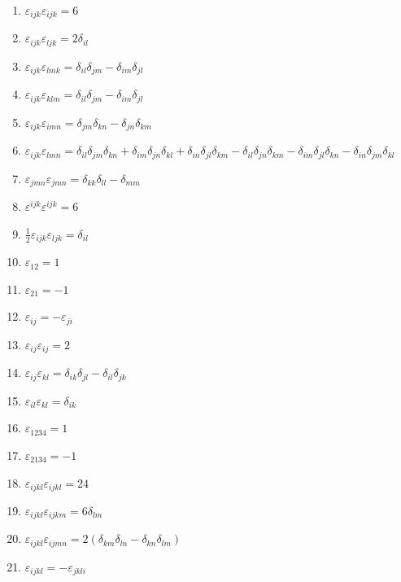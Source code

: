 \documentclass[11pt,a4paper]{article}
\begin{document}
\begin{enumerate}
\item $\displaystyle \varepsilon_{ijk}\varepsilon_{ijk} = 6$
\item $\displaystyle \varepsilon_{ijk}\varepsilon_{ljk} = 2\delta_{il}$
\item $\displaystyle \varepsilon_{ijk}\varepsilon_{lmk} = \delta_{il}\delta_{jm} - \delta_{im}\delta_{jl}$
\item $\displaystyle \varepsilon_{ijk}\varepsilon_{klm} = \delta_{il}\delta_{jm} - \delta_{im}\delta_{jl}$
\item $\displaystyle \varepsilon_{ijk}\varepsilon_{imn} = \delta_{jm}\delta_{kn} - \delta_{jn}\delta_{km}$
\item $\displaystyle \varepsilon_{ijk}\varepsilon_{lmn} = \delta_{il}\delta_{jm}\delta_{kn} + \delta_{im}\delta_{jn}\delta_{kl} + \delta_{in}\delta_{jl}\delta_{km} - \delta_{il}\delta_{jn}\delta_{km} - \delta_{im}\delta_{jl}\delta_{kn} - \delta_{in}\delta_{jm}\delta_{kl}$
\item $\displaystyle \varepsilon_{jmn}\varepsilon_{jmn} = \delta_{kk}\delta_{ll} - \delta_{mm}$
\item $\displaystyle \varepsilon^{ijk}\varepsilon^{ijk} = 6$
\item $\displaystyle \frac{1}{2}\varepsilon_{ijk}\varepsilon_{ljk} = \delta_{il}$
\item $\displaystyle \varepsilon_{12} = 1$
\item $\displaystyle \varepsilon_{21} = -1$
\item $\displaystyle \varepsilon_{ij} = -\varepsilon_{ji}$
\item $\displaystyle \varepsilon_{ij}\varepsilon_{ij} = 2$
\item $\displaystyle \varepsilon_{ij}\varepsilon_{kl} = \delta_{ik}\delta_{jl} - \delta_{il}\delta_{jk}$
\item $\displaystyle \varepsilon_{il}\varepsilon_{kl} = \delta_{ik}$
\item $\displaystyle \varepsilon_{1234} = 1$
\item $\displaystyle \varepsilon_{2134} = -1$
\item $\displaystyle \varepsilon_{ijkl}\varepsilon_{ijkl} = 24$
\item $\displaystyle \varepsilon_{ijkl}\varepsilon_{ijkm} = 6\delta_{lm}$
\item $\displaystyle \varepsilon_{ijkl}\varepsilon_{ijmn} = 2\left( \delta_{km}\delta_{ln} - \delta_{kn}\delta_{lm} \right)$
\item $\displaystyle \varepsilon_{ijkl} = -\varepsilon_{jkli}$

\end{enumerate}
\end{document}
